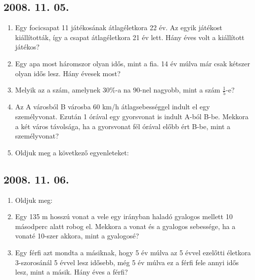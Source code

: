 \subsection*{2008. 11. 05.}
\begin{enumerate}
\item Egy focicsapat 11 játékosának átlagéletkora 22 év. Az egyik játékost kiállították, így a csapat átlagéletkora 21 év lett. Hány éves volt a kiállított játékos?
\item Egy apa most háromszor olyan idős, mint a fia. 14 év múlva már csak kétszer olyan idős lesz. Hány évesek most?
\item Melyik az a szám, amelynek $30\%$-a na $90$-nel nagyobb, mint a szám $\frac{1}{5}$-e?
\item Az A városból B városba 60 km/h átlagsebességgel indult el egy személyvonat. Ezután 1 órával egy gyorsvonat is indult A-ból B-be. Mekkora a két város távolsága, ha a gyorsvonat fél órával előbb ért B-be, mint a személyvonat?
\item Oldjuk meg a következő egyenleteket:
\end{enumerate}


\subsection*{2008. 11. 06.}
\begin{enumerate}
\item Oldjuk meg:
\item Egy 135 m hosszú vonat a vele egy irányban haladó gyalogos mellett 10 másodperc alatt robog el. Mekkora a vonat és a gyalogos sebessége, ha a vonaté 10-szer akkora, mint a gyalogosé?
\item Egy férfi azt mondta a másiknak, hogy 5 év múlva az 5 évvel ezelőtti életkora 3-szorosánál 5 évvel lesz idősebb, még 5 év múlva ez a férfi fele annyi idős lesz, mint a másik. Hány éves a férfi?
\end{enumerate}


